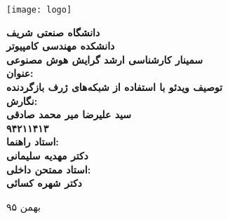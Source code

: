 \thispagestyle{empty}
\begin{center}
\texttt{[image: logo]}
\vskip 1cm
{\bf
دانشگاه صنعتی شریف\\ دانشکده مهندسی کامپیوتر\\ سمینار کارشناسی ارشد گرایش هوش مصنوعی\\
\vskip 1cm
عنوان:\\
توصیف ویدئو با استفاده از شبکه‌های ژرف بازگردنده\\
\vskip 1cm
نگارش:\\
سید علیرضا میر محمد صادقی\\
۹۴۲۱۱۴۱۳\\
\vskip 1cm
استاد راهنما:\\
دکتر مهدیه سلیمانی\\
\vskip 1cm
استاد ممتحن داخلی:\\
دکتر شهره کسائی\\

\vskip 2.5cm

}
بهمن ۹۵
\newpage
\end{center}


